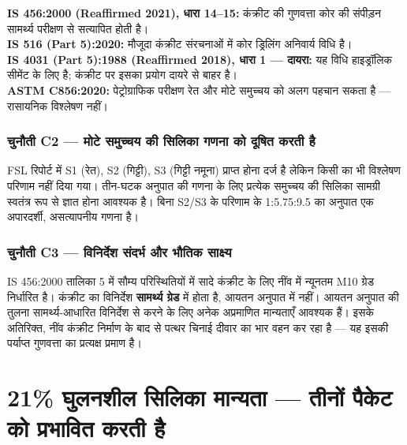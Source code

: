 \documentclass[12pt, a4paper]{article}
\begin{document}
\begin{standardbox}
\textbf{IS 456:2000 (Reaffirmed 2021), धारा 14--15:} कंक्रीट की गुणवत्ता कोर की संपीड़न सामर्थ्य परीक्षण से सत्यापित होती है।\\
\textbf{IS 516 (Part 5):2020:} मौजूदा कंक्रीट संरचनाओं में कोर ड्रिलिंग अनिवार्य विधि है।\\
\textbf{IS 4031 (Part 5):1988 (Reaffirmed 2018), धारा 1 --- दायरा:} यह विधि हाइड्रॉलिक सीमेंट के लिए है; कंक्रीट पर इसका प्रयोग दायरे से बाहर है।\\
\textbf{ASTM C856:2020:} पेट्रोग्राफिक परीक्षण रेत और मोटे समुच्चय को अलग पहचान सकता है --- रासायनिक विश्लेषण नहीं।
\end{standardbox}

\subsubsection{चुनौती C2 --- मोटे समुच्चय की सिलिका गणना को दूषित करती है}

FSL रिपोर्ट में S1 (रेत), S2 (गिट्टी), S3 (गिट्टी नमूना) प्राप्त होना दर्ज है लेकिन किसी का भी विश्लेषण परिणाम नहीं दिया गया। तीन-घटक अनुपात की गणना के लिए प्रत्येक समुच्चय की सिलिका सामग्री स्वतंत्र रूप से ज्ञात होना आवश्यक है। बिना S2/S3 के परिणाम के 1:5.75:9.5 का अनुपात एक अपारदर्शी, असत्यापनीय गणना है।

\subsubsection{चुनौती C3 --- विनिर्देश संदर्भ और भौतिक साक्ष्य}

IS 456:2000 तालिका 5 में सौम्य परिस्थितियों में सादे कंक्रीट के लिए नींव में न्यूनतम M10 ग्रेड निर्धारित है। कंक्रीट का विनिर्देश \textbf{सामर्थ्य ग्रेड} में होता है, आयतन अनुपात में नहीं। आयतन अनुपात की तुलना सामर्थ्य-आधारित विनिर्देश से करने के लिए अनेक अप्रमाणित मान्यताएँ आवश्यक हैं। इसके अतिरिक्त, नींव कंक्रीट निर्माण के बाद से पत्थर चिनाई दीवार का भार वहन कर रहा है --- यह इसकी पर्याप्त गुणवत्ता का प्रत्यक्ष प्रमाण है।

\section{21\% घुलनशील सिलिका मान्यता --- तीनों पैकेट को प्रभावित करती है}
\end{document}
